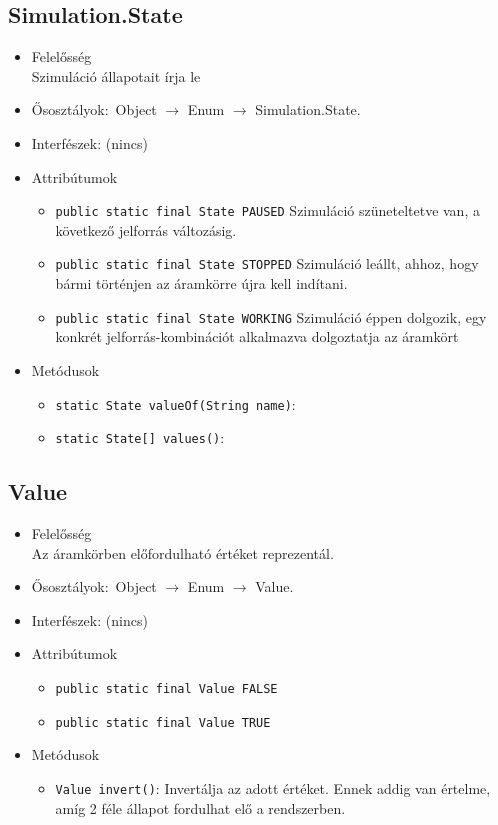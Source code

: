 \subsection{Simulation.State}
\begin{itemize}
\item Felelősség\\
Szimuláció állapotait írja le
\item Ősosztályok:\ Object $\rightarrow{}$ Enum $\rightarrow{}$ Simulation.State.
\item Interfészek: (nincs)
\item Attribútumok $\ $
\begin{itemize}
	\item \texttt{public static final State PAUSED} Szimuláció szüneteltetve van, a következő jelforrás változásig.
	\item \texttt{public static final State STOPPED} Szimuláció leállt, ahhoz, hogy bármi történjen az áramkörre újra kell indítani.
	\item \texttt{public static final State WORKING} Szimuláció éppen dolgozik, egy konkrét jelforrás-kombinációt alkalmazva dolgoztatja az áramkört
\end{itemize}
\item Metódusok$\ $
\begin{itemize}
	\item \texttt{static State valueOf(String name)}: 
	\item \texttt{static State[] values()}: 
\end{itemize}
\end{itemize}

\subsection{Value}
\begin{itemize}
\item Felelősség\\
Az áramkörben előfordulható értéket reprezentál.
\item Ősosztályok:\ Object $\rightarrow{}$ Enum $\rightarrow{}$ Value.
\item Interfészek: (nincs)
\item Attribútumok $\ $
\begin{itemize}
	\item \texttt{public static final Value FALSE} 
	\item \texttt{public static final Value TRUE} 
\end{itemize}
\item Metódusok$\ $
\begin{itemize}
	\item \texttt{Value invert()}: Invertálja az adott értéket. Ennek addig van értelme, amíg 2 féle  állapot fordulhat elő a rendszerben.
\end{itemize}
\end{itemize}

